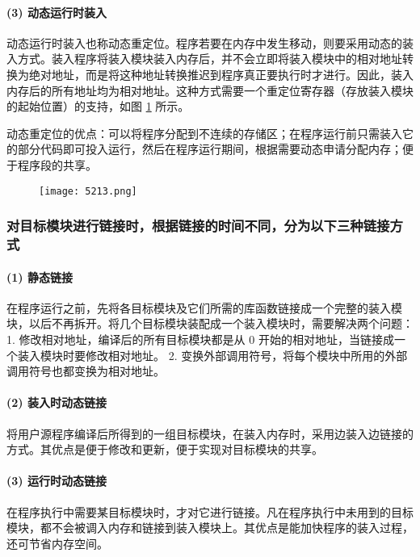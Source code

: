 \documentclass{ctexbook}
\begin{document}
	
	\paragraph{(3) 动态运行时装入}
	
	动态运行时装入也称动态重定位。程序若要在内存中发生移动，则要采用动态的装入方式。装入程序将装入模块装入内存后，并不会立即将装入模块中的相对地址转换为绝对地址，而是将这种地址转换推迟到程序真正要执行时才进行。因此，装入内存后的所有地址均为相对地址。这种方式需要一个重定位寄存器（存放装入模块的起始位置）的支持，如图 \ref{fig:dynamic_load} 所示。
	
	动态重定位的优点：可以将程序分配到不连续的存储区；在程序运行前只需装入它的部分代码即可投入运行，然后在程序运行期间，根据需要动态申请分配内存；便于程序段的共享。
	
	\begin{figure}[h]
		\centering
		\texttt{[image: 5213.png]}
		\label{fig:dynamic_load}
	\end{figure}
	
		\subsubsection{对目标模块进行链接时，根据链接的时间不同，分为以下三种链接方式}
	
	\paragraph{(1) 静态链接}
	
	在程序运行之前，先将各目标模块及它们所需的库函数链接成一个完整的装入模块，以后不再拆开。将几个目标模块装配成一个装入模块时，需要解决两个问题：
	1. 修改相对地址，编译后的所有目标模块都是从 0 开始的相对地址，当链接成一个装入模块时要修改相对地址。
	2. 变换外部调用符号，将每个模块中所用的外部调用符号也都变换为相对地址。
	
	\paragraph{(2) 装入时动态链接}
	
	将用户源程序编译后所得到的一组目标模块，在装入内存时，采用边装入边链接的方式。其优点是便于修改和更新，便于实现对目标模块的共享。
	
	\paragraph{(3) 运行时动态链接}
	
	在程序执行中需要某目标模块时，才对它进行链接。凡在程序执行中未用到的目标模块，都不会被调入内存和链接到装入模块上。其优点是能加快程序的装入过程，还可节省内存空间。
	
\end{document}
